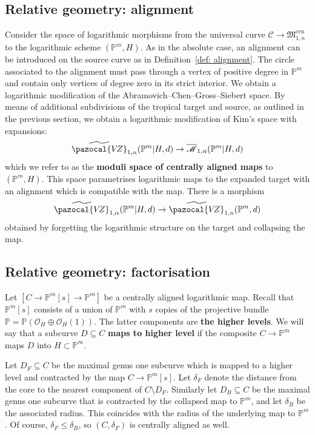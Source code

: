 \documentclass[11pt]{amsart}
\newcommand{\PP}{\mathbb P}
\newcommand{\VZ}{\pazocal{V\!Z}}
\renewcommand{\to}{\rightarrow}
\newcommand{\Mcal}{\mathcal{M}}
\newcommand{\ol}[1]{\overline{#1}}
\theoremstyle{definition}
\theoremstyle{definition}
\begin{document}
\subsection{Relative geometry: alignment} Consider the space of logarithmic morphisms from the universal curve $\mathcal{C} \to \mathfrak{M}_{1,n}^{\mathrm{cen}}$ to the logarithmic scheme $(\PP^m,H)$. As in the absolute case, an alignment can be introduced on the source curve as in Definition~\ref{def: alignment}. The circle associated to the alignment must pass through a vertex of positive degree in $\PP^m$ and contain only vertices of degree zero in its strict interior. We obtain a logarithmic modification of the Abramovich--Chen--Gross--Siebert space. By means of additional subdivisions of the tropical target and source, as outlined in the previous section, we obtain a logarithmic modification of Kim's space with expansions:
\begin{equation*} \widetilde\VZ_{1,\alpha}(\PP^m|H,d) \to \ol\Mcal_{1,\alpha}(\PP^m|H,d)\end{equation*}
which we refer to as the \textbf{moduli space of centrally aligned maps} to $(\PP^m,H)$. This space parametrises logarithmic maps to the expanded target with an alignment which is compatible with the map. There is a morphism
\begin{equation*} \widetilde\VZ_{1,\alpha}(\PP^m|H,d) \to \widetilde\VZ_{1,n}(\PP^m,d)\end{equation*}
obtained by forgetting the logarithmic structure on the target and collapsing the map.


\subsection{Relative geometry: factorisation}\label{subsection factorisation} Let $[C\to \mathbb P^m[s]\to \mathbb P^m]$ be a centrally aligned logarithmic map. Recall that $\mathbb P^m[s]$ consists of a union of $\mathbb P^m$ with $s$ copies of the projective bundle $\mathbb{P} = \mathbb P(\mathcal O_H\oplus \mathcal O_H(1))$. The latter components are \textbf{the higher levels}. We will say that a subcurve $D\subseteq C$ \textbf{maps to higher level} if the composite $C\to \mathbb P^m$ maps $D$ into $H\subset \mathbb P^m$. 

Let $D_F\subseteq C$ be the maximal genus one subcurve which is mapped to a higher level and contracted by the map $C\to \mathbb P^m[s]$. Let $\delta_F$ denote the distance from the core to the nearest component of $C \setminus D_F$. Similarly let $D_B\subseteq C$ be the maximal genus one subcurve that is contracted by the collapsed map to $\mathbb P^m$, and let $\delta_B$ be the associated radius. This coincides with the radius of the underlying map to $\mathbb P^m$. Of course, $\delta_F\leq \delta_B$, so $(C,\delta_F)$ is centrally aligned as well.
\end{document}
